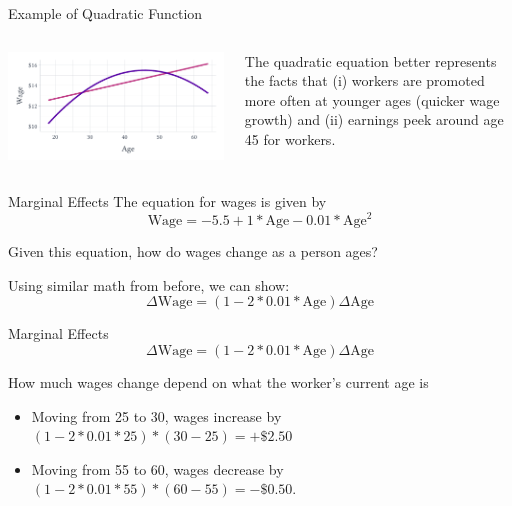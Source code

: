 \documentclass[aspectratio=169,t,11pt,table]{beamer}
\begin{document}
\begin{frame}{Example of Quadratic Function}
  \begin{columns}[T]
    \begin{column}{.60\textwidth}\vspace*{-\bigskipamount}
      \begin{center}
    		\includegraphics[width=\textwidth]{figures/wage_models.pdf}
      \end{center}
    \end{column}
    \begin{column}{.40\textwidth}
      The quadratic equation better represents the facts that (i) workers are promoted more often at younger ages (quicker wage growth) and (ii) earnings peek around age 45 for workers.
    \end{column}
  \end{columns}
\end{frame}

\begin{frame}{Marginal Effects}
	The equation for wages is given by 
	$$
		\text{Wage} = -5.5 + 1 * \text{Age} - 0.01 * \text{Age}^2
	$$

	Given this equation, how do wages change as a person ages? 
	
	\pause
	Using similar math from before, we can show:
	$$
		\Delta \text{Wage} = \left( 1 - 2 * 0.01 * \text{Age} \right) \Delta \text{Age}
	$$
\end{frame}

\begin{frame}{Marginal Effects}
	\vspace*{-2\bigskipamount}
	$$
		\Delta \text{Wage} = \left( 1 - 2 * 0.01 * \text{Age} \right) \Delta \text{Age}
	$$

	\bigskip
	How much wages change depend on what the worker's current age is
	\begin{itemize}
		\item Moving from 25 to 30, wages increase by $(1 - 2 * 0.01 * 25) * (30 - 25) = +\$2.50$
	
		\pause
		\item Moving from 55 to 60, wages decrease by $(1 - 2 * 0.01 * 55) * (60 - 55) = -\$0.50$.
	\end{itemize}
\end{frame}
\end{document}

